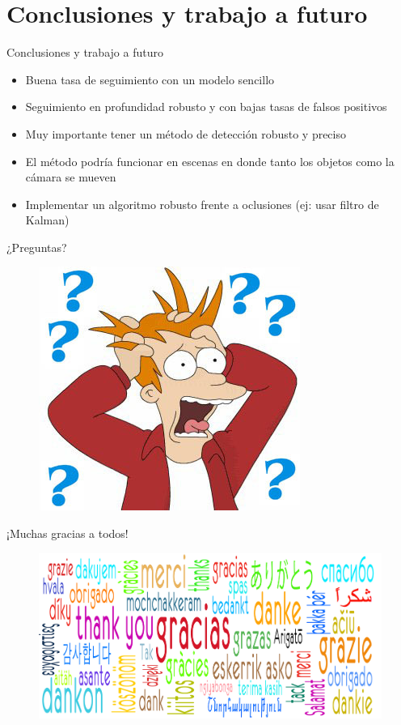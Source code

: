 \documentclass[]{beamer}
\begin{document}
\section{Conclusiones y trabajo a futuro}
\begin{frame}{Conclusiones y trabajo a futuro}
    \begin{itemize}
        \item Buena tasa de seguimiento con un modelo sencillo
        \item Seguimiento en profundidad robusto y con bajas tasas de falsos positivos
        \item Muy importante tener un método de detección robusto y preciso
        \item El método podría funcionar en escenas en donde tanto los objetos como la cámara se mueven
        \item Implementar un algoritmo robusto frente a oclusiones (ej: usar filtro de Kalman)
    \end{itemize}
\end{frame}

\begin{frame}[t]{¿Preguntas?}
    \begin{figure}
        \centering
        \includegraphics[scale=0.5]{img/preguntas.jpg}
    \end{figure}
\end{frame}


\begin{frame}[t]{¡Muchas gracias a todos!}
    \vspace{-20pt}
    \begin{figure}
        \centering
        \hspace*{-18pt}\includegraphics[scale=0.2]{img/gracias.jpg}
    \end{figure}
\end{frame}
\end{document}
